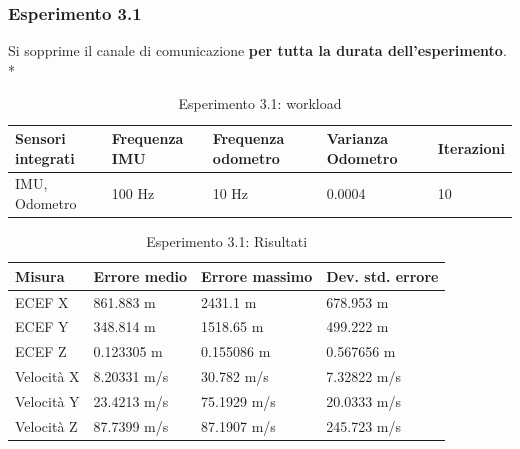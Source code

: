 \subsubsection{Esperimento 3.1}
Si sopprime il canale di comunicazione \textbf{per tutta la durata dell'esperimento}.\\*
\begin{table}[h]
	\centering
	\begin{tabular}{|p{3.25cm}|p{2cm}|p{2cm}|p{2cm}|p{2cm}|}
		\hline 
		\textbf{Sensori integrati} & \textbf{Frequenza IMU}  & \textbf{Frequenza odometro} & \textbf{Varianza Odometro} & \textbf{Iterazioni} \\ 
		\hline 
		IMU, Odometro & 100 Hz & 10 Hz & 0.0004 & 10 \\
		\hline 
	\end{tabular}
	\caption{Esperimento 3.1: workload}
\end{table}
	\begin{table}[h]
	\centering
	\begin{tabular}{|p{2cm}|p{3cm}|p{3cm}|p{3cm}|}
		\hline 
		\textbf{Misura} & \textbf{Errore medio}  & \textbf{Errore massimo} & \textbf{Dev. std. errore}\\ 
		\hline 
		ECEF X & 861.883 m & 2431.1 m & 678.953 m \\ 
		\hline 
		ECEF Y & 348.814 m & 1518.65 m & 499.222 m \\ 
		\hline 
		ECEF Z & 0.123305 m & 0.155086 m & 0.567656 m \\ 
		\hline 
		Velocit\`a X & 8.20331 m/s & 30.782 m/s & 7.32822 m/s \\ 
		\hline 
		Velocit\`a Y & 23.4213 m/s & 75.1929 m/s & 20.0333 m/s \\ 
		\hline 
		Velocit\`a Z & 87.7399 m/s & 87.1907 m/s & 245.723 m/s \\ 
		\hline 
	\end{tabular}
	\caption{Esperimento 3.1: Risultati}
	\label{tab:exp11res}
\end{table}
